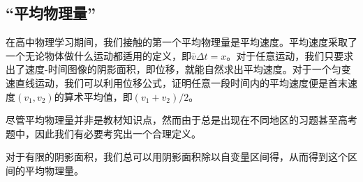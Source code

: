 \subsection{“平均物理量”}
在高中物理学习期间，我们接触的第一个平均物理量是平均速度。平均速度采取了一个无论物体做什么运动都适用的定义，即$\bar v\Delta t=x$。对于任意运动，我们只要求出了速度-时间图像的阴影面积，即位移，就能自然求出平均速度。对于一个匀变速直线运动，我们可以利用位移公式，证明任意一段时间内的平均速度便是首末速度$(v_1,v_2)$的算术平均值，即$(v_1+v_2)/2$。

尽管平均物理量并非是教材知识点，然而由于总是出现在不同地区的习题甚至高考题中，因此我们有必要考究出一个合理定义。

对于有限的阴影面积，我们总可以用阴影面积除以自变量区间得，从而得到这个区间的平均物理量。